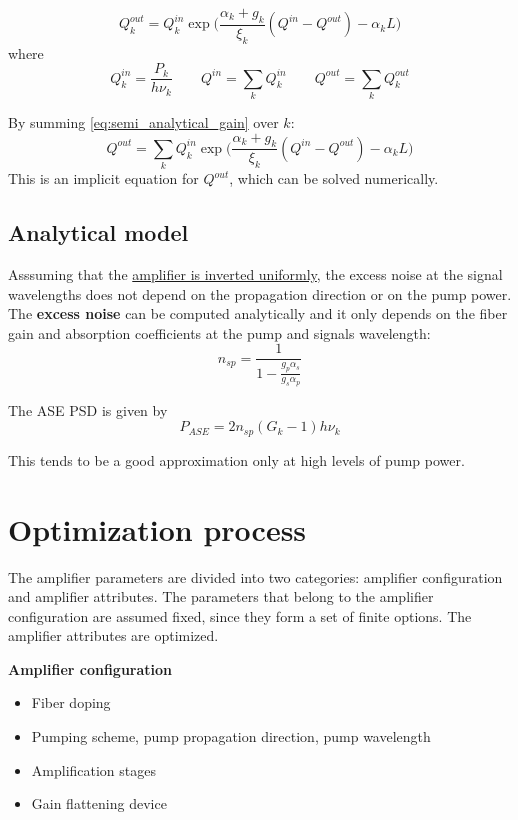 \documentclass[a4paper]{article}
\begin{document}
\begin{equation} \label{eq:semi_analytical_gain}
	Q^{out}_k = Q^{in}_k\exp\Big(\frac{\alpha_k + g_k}{\xi_k}(Q^{in} - Q^{out}) - \alpha_kL\Big)
\end{equation}
where
\begin{equation}
	Q^{in}_k = \frac{P_k}{h\nu_k}\qquad Q^{in} = \sum_k Q^{in}_k \qquad Q^{out} = \sum_k Q^{out}_k
\end{equation}

By summing \eqref{eq:semi_analytical_gain} over $k$:
\begin{equation}
Q^{out} = \sum_kQ^{in}_k\exp\Big(\frac{\alpha_k + g_k}{\xi_k}(Q^{in} - Q^{out}) - \alpha_kL\Big)
\end{equation}
This is an implicit equation for $Q^{out}$, which can be solved numerically. 

\subsection{Analytical model}

Asssuming that the \underline{amplifier is inverted uniformly}, the excess noise at the signal wavelengths does not depend on the propagation direction or on the pump power. The \textbf{excess noise} can be computed analytically and it only depends on the fiber gain and absorption coefficients at the pump and signals wavelength:
\begin{equation}
	n_{sp} = \frac{1}{1 - \displaystyle\frac{g_p\alpha_s}{g_s\alpha_p}}
\end{equation}

The ASE PSD is given by
\begin{equation}
	P_{ASE} = 2n_{sp}(G_k-1)h\nu_k
\end{equation}

This tends to be a good approximation only at high levels of pump power.

\section{Optimization process}

The amplifier parameters are divided into two categories: amplifier configuration and amplifier attributes. The parameters that belong to the amplifier configuration are assumed fixed, since they form a set of finite options. The amplifier attributes are optimized.

\noindent\textbf{Amplifier configuration}
\begin{itemize}
	\item Fiber doping
	\item Pumping scheme, pump propagation direction, pump wavelength
	\item Amplification stages
	\item Gain flattening device
\end{itemize}
\end{document}
